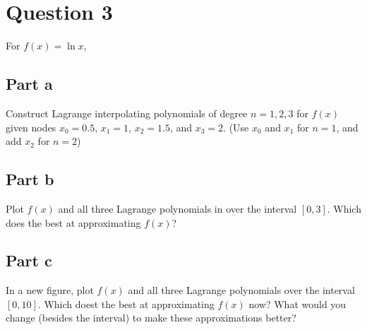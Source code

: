 \section{Question 3}

\begin{question}
    For $f(x) = \ln x$,
\end{question}

\subsection{Part a}

\begin{question}
    Construct Lagrange interpolating polynomials of degree $n = 1,2,3$ for $f(x)$ given nodes $x_0 = 0.5$, $x_1 = 1$, $x_2 = 1.5$, and $x_3 = 2$. (Use $x_0$ and $x_1$ for $n = 1$, and add $x_2$ for $n = 2$)
\end{question}

\begin{answer}
    
\end{answer}

\subsection{Part b}

\begin{question}
    Plot $f(x)$ and all three Lagrange polynomials in \MATLAB over the interval $[0,3]$. Which does the best at approximating $f(x)$?
\end{question}

\begin{answer}
    
\end{answer}

\subsection{Part c}

\begin{question}
    In a new figure, plot $f(x)$ and all three Lagrange polynomials over the interval $[0,10]$. Which doest the best at approximating $f(x)$ now? What would you change (besides the interval) to make these approximations better?
\end{question}

\begin{answer}
    
\end{answer}